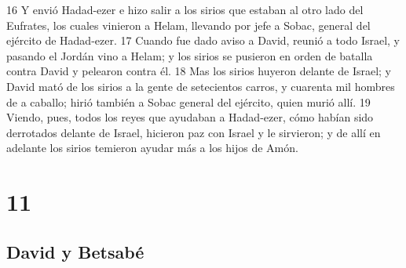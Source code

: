 16 Y envió Hadad-ezer e hizo salir a los sirios que estaban al otro lado del Eufrates, los cuales vinieron a Helam, llevando por jefe a Sobac, general del ejército de Hadad-ezer.
17 Cuando fue dado aviso a David, reunió a todo Israel, y pasando el Jordán vino a Helam; y los sirios se pusieron en orden de batalla contra David y pelearon contra él.
18 Mas los sirios huyeron delante de Israel; y David mató de los sirios a la gente de setecientos carros, y cuarenta mil hombres de a caballo; hirió también a Sobac general del ejército, quien murió allí.
19 Viendo, pues, todos los reyes que ayudaban a Hadad-ezer, cómo habían sido derrotados delante de Israel, hicieron paz con Israel y le sirvieron; y de allí en adelante los sirios temieron ayudar más a los hijos de Amón.

\chapter{11}

\section*{David y Betsabé}

